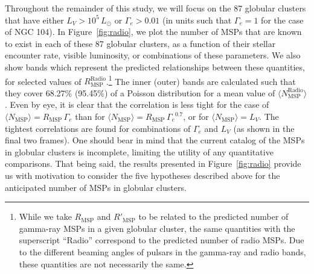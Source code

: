 Throughout the remainder of this study, we will focus on the 87 globular clusters that have either $L_V > 10^5 \, L_{\odot}$ or $\Gamma_e > 0.01$ (in units such that $\Gamma_e =1$ for the case of NGC 104). In Figure~\ref{fig:radio}, we plot the number of MSPs that are known to exist in each of these 87 globular clusters, as a function of their stellar encounter rate, visible luminosity, or combinations of these parameters. We also show bands which represent the predicted relationships between these quantities, for selected values of $R_\textrm{MSP}^\textrm{Radio}$.\footnote{While we take $R_\textrm{MSP}$ and $R'_\textrm{MSP}$ to be related to the predicted number of gamma-ray MSPs in a given globular cluster, the same quantities with the superscript ``Radio'' correspond to the predicted number of radio MSPs. Due to the different beaming angles of pulsars in the gamma-ray and radio bands, these quantities are not necessarily the same.} 
The inner (outer) bands are calculated such that they cover 68.27\% (95.45\%) of a Poisson distribution for a mean value of $\langle N_\textrm{MSP}^\textrm{Radio} \rangle$. Even by eye, it is clear that the correlation is less tight for the case of $\langle N_\textrm{MSP} \rangle = R_\textrm{MSP}\,{\Gamma_e}$ than for $\langle N_\textrm{MSP} \rangle = R_\textrm{MSP}\,{\Gamma_e}^{0.7}$, or for $\langle N_\textrm{MSP} \rangle = L_V$. The tightest correlations are found for combinations of $\Gamma_e$ and $L_V$ (as shown in the final two frames). One should bear in mind that the current catalog of the MSPs in globular clusters is incomplete, limiting the utility of any quantitative comparisons. That being said, the results presented in Figure~\ref{fig:radio} provide us with motivation to consider the five hypotheses described above for the anticipated number of MSPs in globular clusters.


